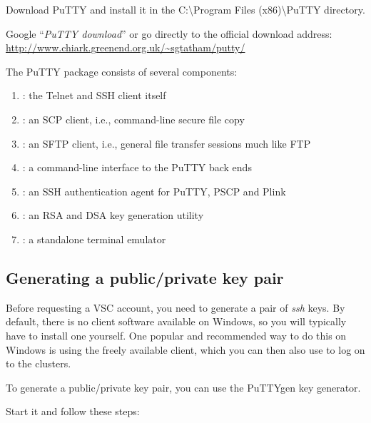   Download PuTTY and install it in the C:\textbackslash Program Files (x86)\textbackslash PuTTY directory.

  Google ``\emph{PuTTY download}'' or go directly to the official download
  address: \url{http://www.chiark.greenend.org.uk/\~sgtatham/putty/}

  The PuTTY package consists of several components:

  \begin{enumerate}
    \item  {}: the Telnet and SSH client itself
    \item  {}: an SCP client, i.e., command-line secure file copy
    \item  {}: an SFTP client, i.e., general file transfer sessions much like FTP
    \item  {}: a command-line interface to the PuTTY back ends
    \item  {}: an SSH authentication agent for PuTTY, PSCP and Plink
    \item  {}: an RSA and DSA key generation utility
    \item  {}: a standalone terminal emulator
  \end{enumerate}

  \subsection{Generating a public/private key pair}
  \label{sec:generate-key-pair}

  Before requesting a VSC account, you need to generate a pair of \emph{ssh}
  keys. By default, there is no  client software available
  on Windows, so you will typically have to install one yourself. One popular and
  recommended way to do this on Windows is using the freely available
   client, which you can then also use to log on to the
  clusters.

  To generate a public/private key pair, you can use the PuTTYgen key generator.

  Start  it and follow these steps:

